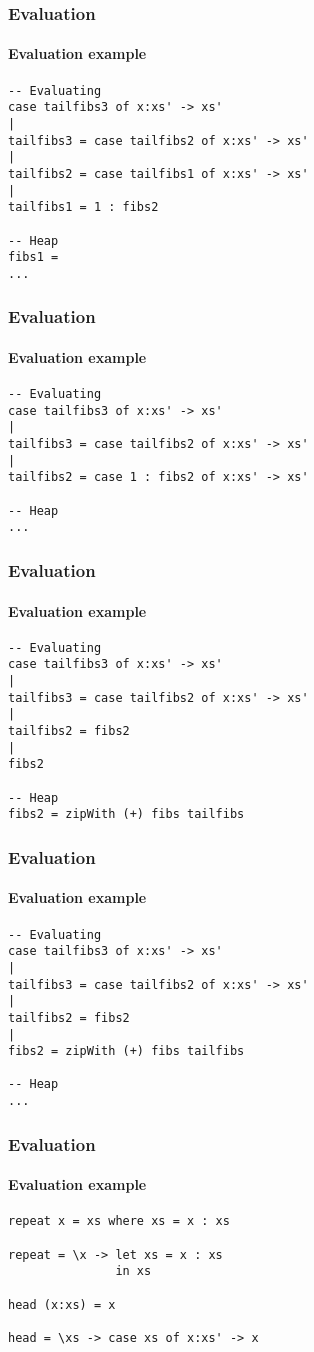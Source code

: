 \documentclass{beamer}
\begin{document}
\begin{frame}[t,fragile]
\frametitle{Evaluation}
\framesubtitle{Evaluation example}
\begin{verbatim}
-- Evaluating
case tailfibs3 of x:xs' -> xs'
|
tailfibs3 = case tailfibs2 of x:xs' -> xs' 
|
tailfibs2 = case tailfibs1 of x:xs' -> xs' 
|
tailfibs1 = 1 : fibs2

-- Heap
fibs1 = 
...
\end{verbatim}
\end{frame}

\begin{frame}[t,fragile]
\frametitle{Evaluation}
\framesubtitle{Evaluation example}
\begin{verbatim}
-- Evaluating
case tailfibs3 of x:xs' -> xs'
|
tailfibs3 = case tailfibs2 of x:xs' -> xs' 
|
tailfibs2 = case 1 : fibs2 of x:xs' -> xs' 

-- Heap
...
\end{verbatim}
\end{frame}

\begin{frame}[t,fragile]
\frametitle{Evaluation}
\framesubtitle{Evaluation example}
\begin{verbatim}
-- Evaluating
case tailfibs3 of x:xs' -> xs'
|
tailfibs3 = case tailfibs2 of x:xs' -> xs' 
|
tailfibs2 = fibs2
|
fibs2

-- Heap
fibs2 = zipWith (+) fibs tailfibs
\end{verbatim}
\end{frame}

\begin{frame}[t,fragile]
\frametitle{Evaluation}
\framesubtitle{Evaluation example}
\begin{verbatim}
-- Evaluating
case tailfibs3 of x:xs' -> xs'
|
tailfibs3 = case tailfibs2 of x:xs' -> xs' 
|
tailfibs2 = fibs2
|
fibs2 = zipWith (+) fibs tailfibs

-- Heap
...
\end{verbatim}
\end{frame}
\fi

\begin{frame}[t,fragile]
\frametitle{Evaluation}
\framesubtitle{Evaluation example}
\begin{verbatim}
repeat x = xs where xs = x : xs

repeat = \x -> let xs = x : xs
               in xs

head (x:xs) = x

head = \xs -> case xs of x:xs' -> x  
\end{verbatim}
\end{frame}
\end{document}
